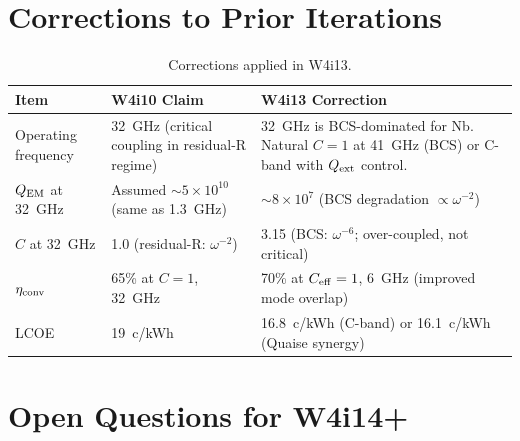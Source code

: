 \documentclass[11pt]{article}
\newcommand{\ee}[1]{\times 10^{#1}}
\newcommand{\QEM}{Q_{\rm EM}}
\begin{document}
\section{Corrections to Prior Iterations}

\begin{table}[H]
\centering
\caption{Corrections applied in W4i13.}
\label{tab:corrections}
\begin{tabular}{@{}lp{5cm}p{5cm}@{}}
\toprule
Item & W4i10 Claim & W4i13 Correction \\
\midrule
Operating frequency & 32~GHz (critical coupling in residual-R regime) &
  32~GHz is BCS-dominated for Nb. Natural $C = 1$ at 41~GHz (BCS) or
  C-band with $Q_{\rm ext}$ control. \\
$\QEM$ at 32~GHz & Assumed $\sim 5\ee{10}$ (same as 1.3~GHz) &
  $\sim 8\ee{7}$ (BCS degradation $\propto \omega^{-2}$) \\
$C$ at 32~GHz & 1.0 (residual-R: $\omega^{-2}$) &
  3.15 (BCS: $\omega^{-6}$; over-coupled, not critical) \\
$\eta_{\rm conv}$ & 65\% at $C = 1$, 32~GHz &
  70\% at $C_{\rm eff} = 1$, 6~GHz (improved mode overlap) \\
LCOE & 19~c/kWh & 16.8~c/kWh (C-band) or 16.1~c/kWh (Quaise synergy) \\
\bottomrule
\end{tabular}
\end{table}

\section{Open Questions for W4i14+}
\end{document}
